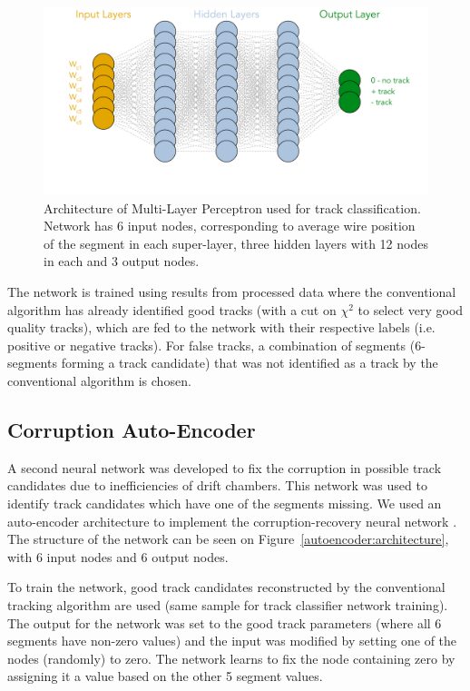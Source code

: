  \begin{figure}[!ht]
\begin{center}
  \includegraphics[width=4.5in]{images/mlp_diagram.pdf}
\caption {Architecture of Multi-Layer Perceptron used for track classification. Network has 6 input nodes, corresponding to average wire position of the segment in each super-layer, three hidden layers with 12 nodes in each and 3 output nodes.}
 \label{mlp:architecture}
 \end{center}
\end{figure}

The network is trained using results from processed data where the conventional algorithm has already 
identified good tracks (with a cut on $\chi^2$ to select very good quality tracks), which are fed to the network with
their respective labels (i.e. positive or negative tracks). For false tracks, a combination 
of segments (6-segments forming a track candidate) that was not identified as a track by the conventional algorithm is chosen.
 
 \subsection{Corruption Auto-Encoder}
 
A second neural network was developed to fix the corruption in possible track candidates due to 
inefficiencies of drift chambers. This network was used to identify track candidates which have one of the segments
missing. We used an auto-encoder architecture to implement the corruption-recovery neural network \cite{Gavalian:2020xmc}. 
The structure of the network can be seen on Figure~\ref{autoencoder:architecture}, with 6 input nodes and 6 output nodes.

To train the network, good track candidates reconstructed by the conventional tracking algorithm are used (same sample 
 for track classifier network training). The output for the network was set to the good track parameters (where all 6 
segments have non-zero values) and the input was modified by setting one of the nodes (randomly) to zero. The network
learns to fix the node containing zero by assigning it a value based on the other 5 segment values. 

